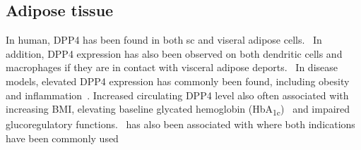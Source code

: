 \subsection{Adipose tissue}
In human, DPP4 has been found in both sc and viseral adipose cells.~\cite{Lamers2011} In addition, DPP4 expression has also been observed on both dendritic cells and macrophages if they are in contact with visceral adipose deports.~\cite{Zhong2013} In disease models, elevated DPP4 expression has commonly been found, including obesity and inflammation~\cite{Zhong2013}. Increased circulating DPP4 level also often associated with increasing BMI, elevating baseline glycated hemoglobin (HbA\textsubscript{1c})~\cite{2011}  and impaired glucoregulatory functions.~\cite{Sell2013}  has also been associated with where both indications have been commonly used 